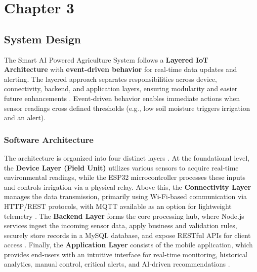 


\setcounter{chapter}{3}
\setcounter{figure}{0}
\setcounter{table}{0}
\chapter*{Chapter 3}
\section{System Design}

The Smart AI Powered Agriculture System follows a \textbf{Layered 
IoT Architecture} \cite{Tzounis2017} with \textbf{event-driven 
behavior} for real-time data updates and alerting. The layered 
approach separates responsibilities across device, connectivity, 
backend, and application layers, ensuring modularity and easier 
future enhancements \cite{farhan2019iotplatform}. Event-driven 
behavior enables immediate actions when sensor readings cross 
defined thresholds (e.g., low soil moisture triggers irrigation and 
an alert).

\subsection{Software Architecture}

The architecture is organized into four distinct layers \cite{Tzounis2017}. At the foundational level, the \textbf{Device Layer (Field Unit)} utilizes various sensors to acquire real-time environmental readings, while the ESP32 microcontroller processes these inputs and controls irrigation via a physical relay. Above this, the \textbf{Connectivity Layer} manages the data transmission, primarily using Wi-Fi-based communication via HTTP/REST protocols, with MQTT available as an option for lightweight telemetry \cite{yokotani2016mqtt}. The \textbf{Backend Layer} forms the core processing hub, where Node.js services ingest the incoming sensor data, apply business and validation rules, securely store records in a MySQL database, and expose RESTful APIs for client access \cite{thilakarathne2023fields}. Finally, the \textbf{Application Layer} consists of the mobile application, which provides end-users with an intuitive interface for real-time monitoring, historical analytics, manual control, critical alerts, and AI-driven recommendations \cite{mobileui2022}.

